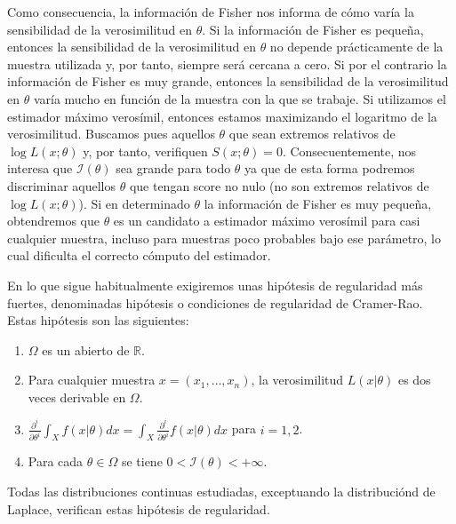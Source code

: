 \documentclass{article}
\begin{document}
    Como consecuencia, la información de Fisher nos informa de cómo varía la sensibilidad de la verosimilitud en $\theta$. Si la información de Fisher es pequeña, entonces la sensibilidad de la verosimilitud en $\theta$ no depende prácticamente de la muestra utilizada y, por tanto, siempre será cercana a cero. Si por el contrario la información de Fisher es muy grande, entonces la sensibilidad de la verosimilitud en $\theta$ varía mucho en función de la muestra con la que se trabaje. Si utilizamos el estimador máximo verosímil, entonces estamos maximizando el logaritmo de la verosimilitud. Buscamos pues aquellos $\theta$ que sean extremos relativos de $\log L(x; \theta)$ y, por tanto, verifiquen $S(x; \theta) = 0$. Consecuentemente, nos interesa que $\mathcal{I}(\theta)$ sea grande para todo $\theta$ ya que de esta forma podremos discriminar aquellos $\theta$ que tengan score no nulo (no son extremos relativos de $\log L(x; \theta)$). Si en determinado $\theta$ la información de Fisher es muy pequeña, obtendremos que $\theta$ es un candidato a estimador máximo verosímil para casi cualquier muestra, incluso para muestras poco probables bajo ese parámetro, lo cual dificulta el correcto cómputo del estimador.

    En lo que sigue habitualmente exigiremos unas hipótesis de regularidad más fuertes, denominadas hipótesis o condiciones de regularidad de Cramer-Rao. Estas hipótesis son las siguientes:

    \begin{enumerate}[label=\roman*)]
        \item $\Omega$ es un abierto de $\mathbb{R}$.
        \item Para cualquier muestra $x = (x_1, \ldots, x_n)$, la verosimilitud $L(x | \theta)$ es dos veces derivable en $\Omega$.
        \item $\frac{\partial^i}{\partial\theta^i} \int_X f(x | \theta) dx = \int_X \frac{\partial^i}{\partial\theta^i} f(x | \theta) dx$ para $i=1,2$.
        \item Para cada $\theta \in \Omega$ se tiene $0 < \mathcal{I}(\theta) < +\infty$.
    \end{enumerate}

    Todas las distribuciones continuas estudiadas, exceptuando la distribuciónd de Laplace, verifican estas hipótesis de regularidad.
\end{document}

